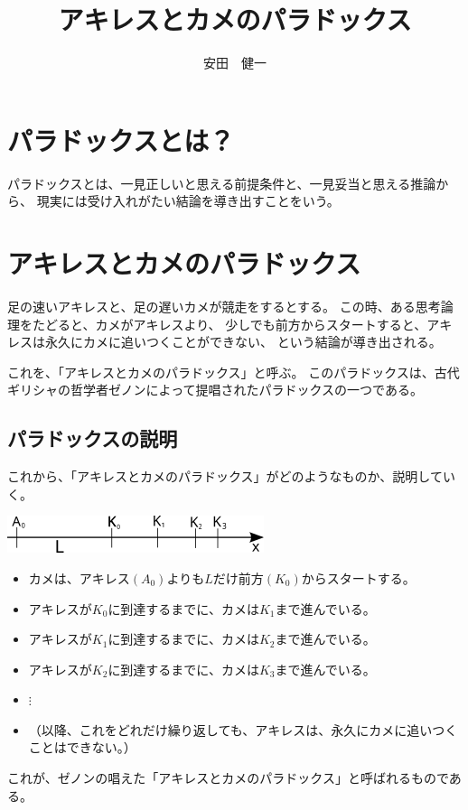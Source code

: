 \documentclass[12pt,a4paper,fleqn]{ltjsarticle}
\begin{document}
\title{アキレスとカメのパラドックス}
\author{安田　健一}
\maketitle

\section{パラドックスとは？}
パラドックスとは、一見正しいと思える前提条件と、一見妥当と思える推論から、
現実には受け入れがたい結論を導き出すことをいう。

\section{アキレスとカメのパラドックス}

足の速いアキレスと、足の遅いカメが競走をするとする。
この時、ある思考論理をたどると、カメがアキレスより、
少しでも前方からスタートすると、アキレスは永久にカメに追いつくことができない、
という結論が導き出される。

これを、「アキレスとカメのパラドックス」と呼ぶ。
このパラドックスは、古代ギリシャの哲学者ゼノンによって提唱されたパラドックスの一つである。

\subsection{パラドックスの説明}

これから、「アキレスとカメのパラドックス」がどのようなものか、説明していく。
\begin{center}
  \includegraphics{Achilles.png}
\end{center}
\begin{itemize}
	\item カメは、アキレス$(A_0)$よりも$L$だけ前方$(K_0)$からスタートする。
  \item アキレスが$K_0$に到達するまでに、カメは$K_1$まで進んでいる。
  \item アキレスが$K_1$に到達するまでに、カメは$K_2$まで進んでいる。
  \item アキレスが$K_2$に到達するまでに、カメは$K_3$まで進んでいる。
  \item $\vdots$
  \item （以降、これをどれだけ繰り返しても、アキレスは、永久にカメに追いつくことはできない。）
\end{itemize}
これが、ゼノンの唱えた「アキレスとカメのパラドックス」と呼ばれるものである。
\end{document}
